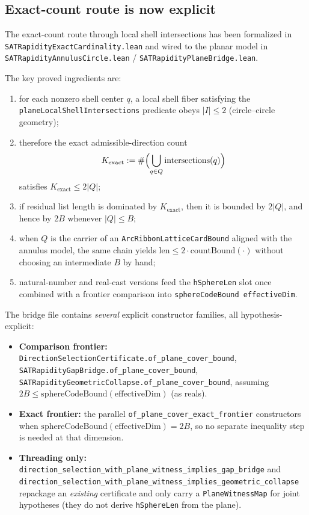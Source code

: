 \documentclass[11pt]{article}
\begin{document}
\subsection{Exact-count route is now explicit}

The exact-count route through local shell intersections has been formalized in
\texttt{SATRapidityExactCardinality.lean} and wired to the planar model in
\texttt{SATRapidityAnnulusCircle.lean} / \texttt{SATRapidityPlaneBridge.lean}.

The key proved ingredients are:

\begin{enumerate}[leftmargin=2em]
  \item for each nonzero shell center \(q\), a local shell fiber satisfying the
  \texttt{planeLocalShellIntersections} predicate obeys \(|I|\le 2\) (circle--circle geometry);
  \item therefore the exact admissible-direction count
  \[
    K_{\mathrm{exact}} := \#\Bigl(\bigcup_{q \in Q} \mathrm{intersections}(q)\Bigr)
  \]
  satisfies \(K_{\mathrm{exact}} \le 2 |Q|\);
  \item if residual list length is dominated by \(K_{\mathrm{exact}}\), then it is bounded by
  \(2|Q|\), and hence by \(2B\) whenever \(|Q| \le B\);
  \item when \(Q\) is the carrier of an \texttt{ArcRibbonLatticeCardBound} aligned with the
  annulus model, the same chain yields \(\mathrm{len} \le 2\cdot\mathrm{countBound}(\cdot)\)
  without choosing an intermediate \(B\) by hand;
  \item natural-number and real-cast versions feed the \texttt{hSphereLen} slot once combined
  with a frontier comparison into \texttt{sphereCodeBound effectiveDim}.
\end{enumerate}

The bridge file contains \emph{several} explicit constructor families, all hypothesis-explicit:

\begin{itemize}[leftmargin=2em]
  \item \textbf{Comparison frontier:} \texttt{DirectionSelectionCertificate.of\_plane\_cover\_bound},
  \texttt{SATRapidityGapBridge.of\_plane\_cover\_bound},
  \texttt{SATRapidityGeometricCollapse.of\_plane\_cover\_bound}, assuming
  \(2B \le \mathrm{sphereCodeBound}(\mathrm{effectiveDim})\) (as reals).
  \item \textbf{Exact frontier:} the parallel \texttt{of\_plane\_cover\_exact\_frontier} constructors
  when \(\mathrm{sphereCodeBound}(\mathrm{effectiveDim}) = 2B\), so no separate inequality step
  is needed at that dimension.
  \item \textbf{Threading only:}
  \texttt{direction\_selection\_with\_plane\_witness\_implies\_gap\_bridge} and
  \texttt{direction\_selection\_with\_plane\_witness\_implies\_geometric\_collapse}
  repackage an \emph{existing} certificate and only carry a
  \texttt{PlaneWitnessMap} for joint hypotheses (they do not derive \texttt{hSphereLen} from the plane).
\end{itemize}
\end{document}

